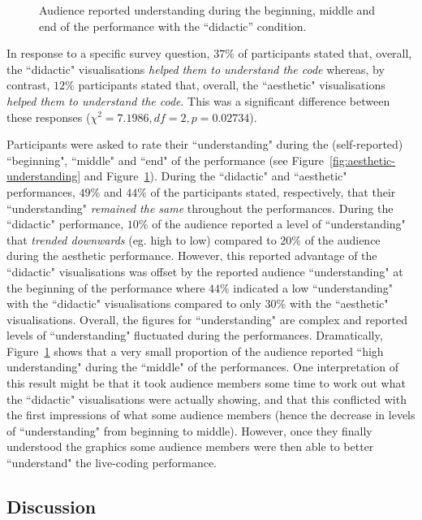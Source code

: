 \documentclass{sig-alternate}
\begin{document}
\begin{figure}
\centering
{}
\caption{Audience reported understanding during the beginning, middle and end of the performance with the ``didactic'' condition.}
\label{fig:didactic-understanding}
\end{figure}

In response to a specific survey question, $37\%$ of participants stated that, overall, the ``didactic" visualisations \textit{helped them to understand the code} whereas, by contrast, $12\%$ participants stated that, overall, the ``aesthetic" visualisations \textit{helped them to understand the code}. This was a significant difference between these responses ($\chi^2=7.1986,df=2,p=0.02734$).

Participants were asked to rate their ``understanding" during the (self-reported) ``beginning", ``middle" and ``end" of the performance (see Figure~\ref{fig:aesthetic-understanding} and Figure~\ref{fig:didactic-understanding}). During the ``didactic" and ``aesthetic" performances, $49\%$ and $44\%$ of the participants stated, respectively, that their ``understanding" \textit{remained the same} throughout the performances. During the ``didactic" performance, $10\%$ of the audience reported a level of ``understanding" that \textit{trended downwards} (eg. high to low) compared to $20\%$ of the audience during the aesthetic performance. However, this reported advantage of the ``didactic" visualisations was offset by the reported audience ``understanding" at the beginning of the performance where $44\%$ indicated a low ``understanding" with the ``didactic" visualisations compared to only $30\%$ with the ``aesthetic" visualisations. Overall, the figures for ``understanding" are complex and reported levels of ``understanding" fluctuated during the performances. Dramatically, Figure~\ref{fig:didactic-understanding} shows that a very small proportion of the audience reported ``high understanding" during the ``middle" of the performances. One interpretation of this result might be that it took audience members some time to work out what the ``didactic" visualisations were actually showing, and that this conflicted with the first impressions of what some audience members (hence the decrease in levels of ``understanding" from beginning to middle). However, once they finally understood the graphics some audience members were then able to better ``understand" the live-coding performance. 

\subsection{Discussion}
\end{document}
